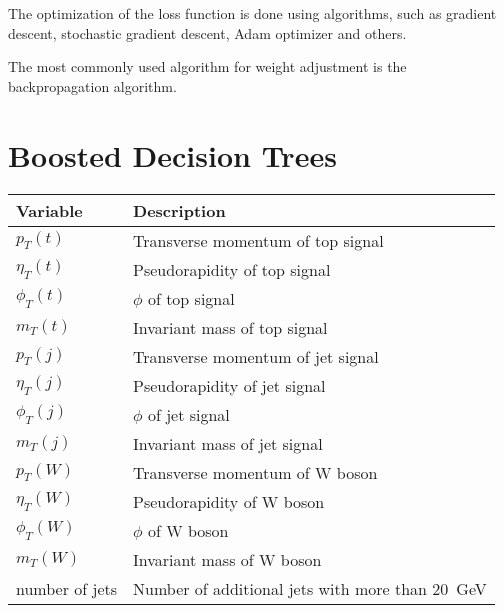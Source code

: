 The optimization of the loss function is done using algorithms, such as gradient descent, stochastic gradient descent, Adam optimizer and others.

The most commonly used algorithm for weight adjustment is the backpropagation algorithm.
\section{Boosted Decision Trees}

\begin{center}
    \begin{tabular}{ll}
    \hline
    Variable & Description\\
    \hline
    $p_T(t)$ & Transverse momentum of top signal\\
    $\eta_T(t)$ & Pseudorapidity of top signal\\
    $\phi_T(t)$ & $\phi$ of top signal\\
    $m_T(t)$ & Invariant mass of top signal\\

    $p_T(j)$ & Transverse momentum of jet signal\\
    $\eta_T(j)$ & Pseudorapidity of jet signal\\
    $\phi_T(j)$ & $\phi$ of jet signal\\
    $m_T(j)$ & Invariant mass of jet signal\\

    $p_T(W)$ & Transverse momentum of W boson\\
    $\eta_T(W)$ & Pseudorapidity of W boson\\
    $\phi_T(W)$ & $\phi$ of W boson\\
    $m_T(W)$ & Invariant mass of W boson\\

    number of jets & Number of additional jets with more than \SI{20}{GeV}\\
  \end{tabular}
\end{center}
